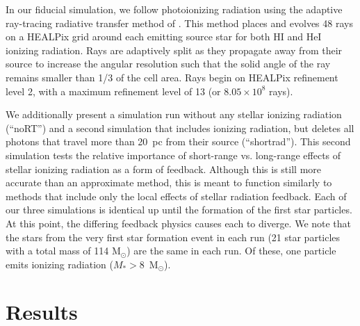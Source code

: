 \documentclass[twocolumn]{aastex62}
\begin{document}
{%
In our fiducial simulation, we follow photoionizing radiation using the adaptive ray-tracing radiative transfer method of \cite{WiseAbel2011}. This method places and evolves 48 rays on a HEALPix grid around each emitting source star for both HI and HeI ionizing radiation. Rays are adaptively split as they propagate away from their source to increase the angular resolution such that the solid angle of the ray remains smaller than 1/3 of the cell area. Rays begin on HEALPix refinement level 2, with a maximum refinement level of 13 (or $8.05 \times 10^8$ rays).

We additionally present a simulation run without any stellar ionizing radiation (``noRT'') and a second simulation that includes ionizing radiation, but deletes all photons that travel more than 20~pc from their source (``shortrad''). This second simulation tests the relative importance of short-range vs. long-range effects of stellar ionizing radiation as a form of feedback. Although this is still more accurate than an approximate method, this is meant to function similarly to methods that include only the local effects of stellar radiation feedback. Each of our three simulations is identical up until the formation of the first star particles. At this point, the differing feedback physics causes each to diverge. We note that the stars from the very first star formation event in each run (21 star particles with a total mass of 114 M$_{\odot}$) are the same in each run. Of these, one particle emits ionizing radiation ($M_* > 8 $~M$_{\odot}$). 

\section{Results} \label{sec:results}

}
\end{document}
